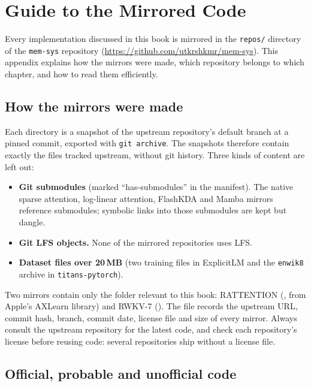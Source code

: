 \chapter{Guide to the Mirrored Code}\label{app:code}

Every implementation discussed in this book is mirrored in the \texttt{repos/} directory of
the \texttt{mem-sys} repository (\url{https://github.com/utkrshkmr/mem-sys}). This appendix
explains how the mirrors were made, which repository belongs to which chapter, and how to read
them efficiently.

\section{How the mirrors were made}

Each directory  is a snapshot of the upstream repository's default
branch at a pinned commit, exported with \texttt{git archive}. The snapshots therefore contain
exactly the files tracked upstream, without git history. Three kinds of content are left out:
\begin{itemize}
  \item \textbf{Git submodules} (marked ``has-submodules'' in the manifest). The native sparse
    attention, log-linear attention, FlashKDA and Mamba mirrors reference submodules; symbolic
    links into those submodules are kept but dangle.
  \item \textbf{Git LFS objects.} None of the mirrored repositories uses LFS.
  \item \textbf{Dataset files over 20\,MB} (two training files in ExplicitLM and the
    \texttt{enwik8} archive in \texttt{titans-pytorch}).
\end{itemize}
Two mirrors contain only the folder relevant to this book: RATTENTION
(, from Apple's AXLearn library) and RWKV-7
(). The file  records the upstream
URL, commit hash, branch, commit date, license file and size of every mirror. Always consult
the upstream repository for the latest code, and check each repository's license before
reusing code: several repositories ship without a license file.

\section{Official, probable and unofficial code}

